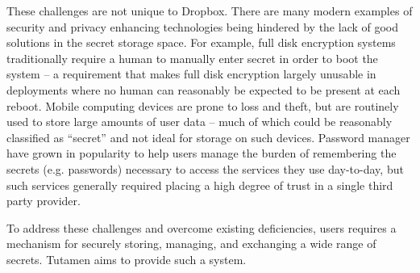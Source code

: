 These challenges are not unique to Dropbox. There are many modern
examples of security and privacy enhancing technologies being hindered
by the lack of good solutions in the secret storage space. For
example, full disk encryption systems traditionally require a human to
manually enter secret in order to boot the system -- a requirement
that makes full disk encryption largely unusable in deployments where
no human can reasonably be expected to be present at each
reboot. Mobile computing devices are prone to loss and theft, but are
routinely used to store large amounts of user data -- much of which
could be reasonably classified as ``secret'' and not ideal for storage
on such devices. Password manager have grown in popularity to help
users manage the burden of remembering the secrets (e.g. passwords)
necessary to access the services they use day-to-day, but such
services generally required placing a high degree of trust in a single
third party provider.

To address these challenges and overcome existing deficiencies, users
requires a mechanism for securely storing, managing, and exchanging a
wide range of secrets. Tutamen aims to provide such a system.

